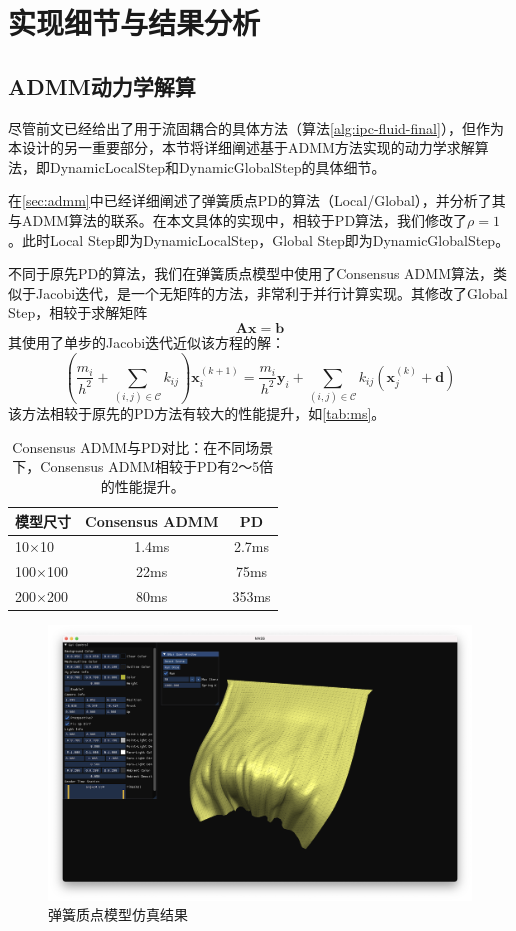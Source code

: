 \chapter{实现细节与结果分析}\label{chap:experiment}

\section{ADMM动力学解算}\label{sec:experiment-admm}

尽管前文已经给出了用于流固耦合的具体方法（算法\ref{alg:ipc-fluid-final}），但作为本设计的另一重要部分，本节将详细阐述基于ADMM方法实现的动力学求解算法，即DynamicLocalStep和DynamicGlobalStep的具体细节。

在\ref{sec:admm}中已经详细阐述了弹簧质点PD的算法（Local/Global），并分析了其与ADMM算法的联系。在本文具体的实现中，相较于PD算法，我们修改了$\rho = 1$。此时Local Step即为DynamicLocalStep，Global Step即为DynamicGlobalStep。

不同于原先PD的算法，我们在弹簧质点模型中使用了Consensus ADMM算法，类似于Jacobi迭代，是一个无矩阵的方法，非常利于并行计算实现。其修改了Global Step，相较于求解矩阵
\begin{equation}
  \mathbf A \mathbf x = \mathbf b
\end{equation}
其使用了单步的Jacobi迭代近似该方程的解：
\begin{equation}
 \left(\frac{m_i}{h^2} + \sum_{(i, j) \in \mathcal C} k_{ij}\right) \mathbf x^{(k+1)}_i = \frac{m_i}{h^2} \mathbf y_i + 
\sum_{(i, j)\in \mathcal C} k_{ij} (\mathbf x^{(k)}_j + \mathbf d) 
\end{equation}
该方法相较于原先的PD方法有较大的性能提升，如\ref{tab:ms}。
\begin{table}
  \centering
  \begin{tabular}{l|cc}
    模型尺寸& Consensus ADMM & PD\\
    \hline
    10$\times$10 & 1.4ms & 2.7ms \\
    100$\times$100 & 22ms & 75ms \\
    200$\times$200 & 80ms & 353ms
  \end{tabular}
  \caption{Consensus ADMM与PD对比：在不同场景下，Consensus ADMM相较于PD有2～5倍的性能提升。}\label{tab:mass-spring-benchmark}
\end{table}

\begin{figure}[hbt]
  \centering
  \includegraphics[width=0.8\linewidth]{img/mass-sp-result-norend.png}
  \caption{弹簧质点模型仿真结果}
\end{figure}

